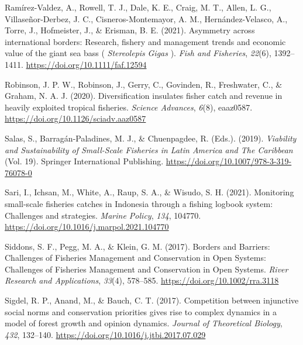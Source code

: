 \documentclass[
  12pt,
]{article}
\newlength{\cslhangindent}
\newlength{\cslentryspacingunit} %
\newenvironment{CSLReferences}[2] %
 {%
  \setlength{\parindent}{0pt}
  \ifodd #1
  \let\oldpar\par
  \def\par{\hangindent=\cslhangindent\oldpar}
  \fi
  \setlength{\parskip}{#2\cslentryspacingunit}
 }%
 {}
\begin{document}
\begin{CSLReferences}{1}{2}
\leavevmode{}%
Ramírez-Valdez, A., Rowell, T. J., Dale, K. E., Craig, M. T., Allen, L. G., Villaseñor-Derbez, J. C., Cisneros-Montemayor, A. M., Hernández-Velasco, A., Torre, J., Hofmeister, J., \& Erisman, B. E. (2021). Asymmetry across international borders: {Research}, fishery and management trends and economic value of the giant sea bass ( {\emph{Stereolepis}}{ \emph{Gigas}} ). \emph{Fish and Fisheries}, \emph{22}(6), 1392--1411. \url{https://doi.org/10.1111/faf.12594}

\leavevmode{}%
Robinson, J. P. W., Robinson, J., Gerry, C., Govinden, R., Freshwater, C., \& Graham, N. A. J. (2020). Diversification insulates fisher catch and revenue in heavily exploited tropical fisheries. \emph{Science Advances}, \emph{6}(8), eaaz0587. \url{https://doi.org/10.1126/sciadv.aaz0587}

\leavevmode{}%
Salas, S., Barragán-Paladines, M. J., \& Chuenpagdee, R. (Eds.). (2019). \emph{Viability and {Sustainability} of {Small-Scale Fisheries} in {Latin America} and {The Caribbean}} (Vol. 19). {Springer International Publishing}. \url{https://doi.org/10.1007/978-3-319-76078-0}

\leavevmode{}%
Sari, I., Ichsan, M., White, A., Raup, S. A., \& Wisudo, S. H. (2021). Monitoring small-scale fisheries catches in {Indonesia} through a fishing logbook system: {Challenges} and strategies. \emph{Marine Policy}, \emph{134}, 104770. \url{https://doi.org/10.1016/j.marpol.2021.104770}

\leavevmode{}%
Siddons, S. F., Pegg, M. A., \& Klein, G. M. (2017). Borders and {Barriers}: Challenges of {Fisheries Management} and {Conservation} in {Open Systems}: {Challenges} of {Fisheries Management} and {Conservation} in {Open Systems}. \emph{River Research and Applications}, \emph{33}(4), 578--585. \url{https://doi.org/10.1002/rra.3118}

\leavevmode{}%
Sigdel, R. P., Anand, M., \& Bauch, C. T. (2017). Competition between injunctive social norms and conservation priorities gives rise to complex dynamics in a model of forest growth and opinion dynamics. \emph{Journal of Theoretical Biology}, \emph{432}, 132--140. \url{https://doi.org/10.1016/j.jtbi.2017.07.029}


\end{CSLReferences}
\end{document}
